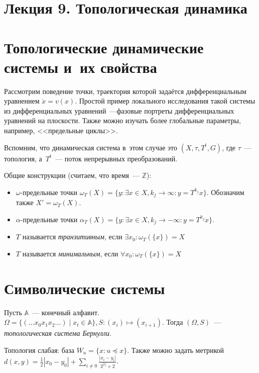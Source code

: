 \documentclass{article}
\begin{document}
\section*{Лекция 9. Топологическая динамика}
\resetcntrs

\section{Топологические динамические системы и~их свойства}

Рассмотрим поведение точки, траектория которой задаётся дифференциальным
уравнением $\dot{x} = v(x)$. Простой пример локального исследования такой
системы из дифференциальных уравнений~---фазовые портреты дифференциальных
уравнений на плоскости. Также можно изучать более глобальные параметры,
например, <<предельные циклы>>.

Вспомним, что динамическая система в~этом случае это $(X, \tau, T^t, G)$, где
$\tau$~--- топология, а~$T^t$~--- поток непрерывных преобразований.

Общие конструкции (считаем, что время~--- $\mathbb{Z}$):
\begin{itemize}
	\item $\omega$-предельные точки $\omega_T(X) = \{y: \exists x \in X, k_j
		\rightarrow \infty: y = T^{k_j}x \}$. Обозначим также $X' = \omega_T(X)$.
	\item $\alpha$-предельные точки $\alpha_T(X) = \{y: \exists x \in X, k_j
		\rightarrow -\infty: y = T^{k_j}x \}$.
	\item $T$ называется \emph{транзитивным}, если $\exists x_0: \omega_T(\{x\}) =
		X$
	\item $T$ называется \emph{минимальным}, если $\forall x_0: \omega_T(\{x\}) =
		X$
\end{itemize}

\section{Символические системы}

\begin{definition}
	Пусть $\mathbb{A}$~--- конечный алфавит. $\Omega = \{(\ldots x_0 x_1 x_2
	\ldots) \mid x_t \in \mathbb{A}\}, S: (x_i) \mapsto (x_{i+1})$. Тогда
	$(\Omega, S)$~--- \emph{топологическая система Бернулли}.

	Топология слабая: база $W_u = \{x: u \preceq x\}$. Также можно задать метрикой
	$d(x, y) = \frac{1}{2} |x_0 - y_0| + \sum\limits_{i \ne 0} \frac{|x_i - y_i|}
	{2^{|i|} + 2}$.
\end{definition}
\end{document}
